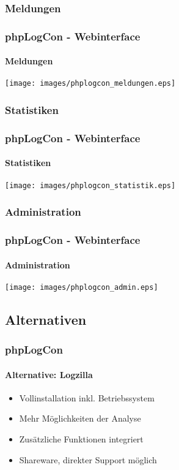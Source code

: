 \subsubsection{Meldungen}
\begin{frame}
	\frametitle{phpLogCon - Webinterface}
	\framesubtitle{Meldungen}
	\begin{center}
		\texttt{[image: images/phplogcon\_meldungen.eps]}
	\end{center}
\end{frame}

\subsubsection{Statistiken}
\begin{frame}
	\frametitle{phpLogCon - Webinterface}
	\framesubtitle{Statistiken}
	\begin{center}
		\texttt{[image: images/phplogcon\_statistik.eps]}
	\end{center}
\end{frame}

\subsubsection{Administration}
\begin{frame}
	\frametitle{phpLogCon - Webinterface}
	\framesubtitle{Administration}
	\begin{center}
	 	\texttt{[image: images/phplogcon\_admin.eps]}
	\end{center}
\end{frame}

\subsection{Alternativen}
\begin{frame}
	\frametitle{phpLogCon}
	\framesubtitle{Alternative: Logzilla}
	\begin{itemize}
		\item Vollinstallation inkl. Betriebssystem
		\item Mehr Möglichkeiten der Analyse
		\item Zusätzliche Funktionen integriert
		\item Shareware, direkter Support möglich
	\end{itemize}
\end{frame}